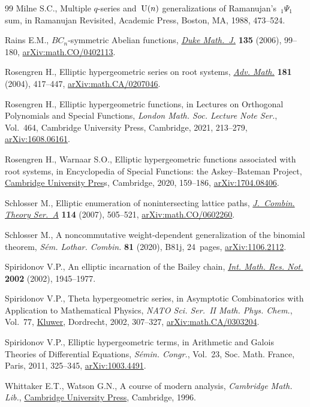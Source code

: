 \documentclass[10pt,a4paper]{amsart}
\numberwithin{equation}{section}
\theoremstyle{definition}
\begin{document}
\begin{thebibliography}{99}
Milne S.C., Multiple {$q$}-series and~{${\rm U}(n)$} generalizations of
 {R}amanujan's~{$_1\Psi_1$} sum, in Ramanujan {R}evisited, Academic Press,
 Boston, MA, 1988, 473--524.

Rains E.M., {$BC_n$}-symmetric {A}belian functions,
 \href{https://doi.org/10.1215/S0012-7094-06-13513-5}{\textit{Duke Math.~J.}}
 \textbf{135} (2006), 99--180,
 \href{http://arxiv.org/abs/math.CO/0402113}{arXiv:math.CO/0402113}.

Rosengren H., Elliptic hypergeometric series on root systems,
 \href{https://doi.org/10.1016/S0001-8708(03)00071-9}{\textit{Adv. Math.}}
 \textbf{181} (2004), 417--447,
 \href{http://arxiv.org/abs/math.CA/0207046}{arXiv:math.CA/0207046}.

Rosengren H., Elliptic hypergeometric functions, in Lectures on {O}rthogonal
 {P}olynomials and {S}pecial {F}unctions, \textit{London Math. Soc. Lecture
 Note Ser.}, Vol.~464, Cambridge University Press, Cambridge, 2021, 213--279,
 \href{http://arxiv.org/abs/1608.06161}{arXiv:1608.06161}.

Rosengren H., Warnaar S.O., Elliptic hypergeometric functions associated with
 root systems, in Encyclopedia of {S}pecial {F}unctions: the
 {A}skey--{B}ateman {P}roject,
 \href{https://doi.org/10.1017/9780511777165.007}{Cambridge University Pres}s,
 Cambridge, 2020, 159--186,
 \href{http://arxiv.org/abs/1704.08406}{arXiv:1704.08406}.

Schlosser M., Elliptic enumeration of nonintersecting lattice paths,
 \href{https://doi.org/10.1016/j.jcta.2006.07.002}{\textit{J.~Combin. Theory
 Ser.~A}} \textbf{114} (2007), 505--521,
 \href{http://arxiv.org/abs/math.CO/0602260}{arXiv:math.CO/0602260}.

Schlosser M., A noncommutative weight-dependent generalization of the binomial
 theorem, \textit{S\'em. Lothar. Combin.} \textbf{81} (2020), B81j, 24~pages,
 \href{http://arxiv.org/abs/1106.2112}{arXiv:1106.2112}.

Spiridonov V.P., An elliptic incarnation of the {B}ailey chain,
 \href{https://doi.org/10.1155/S1073792802205127}{\textit{Int. Math. Res.
 Not.}} \textbf{2002} (2002), 1945--1977.

Spiridonov V.P., Theta hypergeometric series, in Asymptotic {C}ombinatorics
 with {A}pplication to {M}athematical {P}hysics, \textit{NATO Sci. Ser.~II
 Math. Phys. Chem.}, Vol.~77,
 \href{https://doi.org/10.1007/978-94-010-0575-3_15}{Kluwer}, Dordrecht, 2002,
 307--327, \href{http://arxiv.org/abs/math.CA/0303204}{arXiv:math.CA/0303204}.

Spiridonov V.P., Elliptic hypergeometric terms, in Arithmetic and {G}alois
 {T}heories of {D}ifferential {E}quations, \textit{S\'emin. Congr.}, Vol.~23,
 Soc. Math. France, Paris, 2011, 325--345,
 \href{http://arxiv.org/abs/1003.4491}{arXiv:1003.4491}.

Whittaker E.T., Watson G.N., A course of modern analysis, \textit{Cambridge Math. Lib.},
 \href{https://doi.org/10.1017/CBO9780511608759}{Cambridge University Press},
 Cambridge, 1996.

\end{thebibliography}
\end{document}
